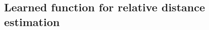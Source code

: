 
\subsection{Learned function for relative distance estimation }\label{sec:results:distance-estimation:learned}



